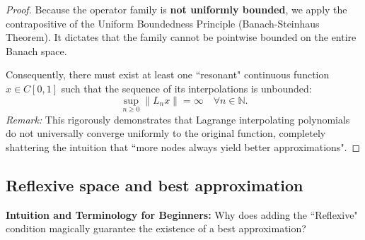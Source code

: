 \documentclass[11pt,a4paper]{article}
\theoremstyle{plain}
\theoremstyle{definition}
\begin{document}
\begin{proof}
    Because the operator family is \textbf{not uniformly bounded}, we apply the contrapositive of the Uniform Boundedness Principle (Banach-Steinhaus Theorem). It dictates that the family cannot be pointwise bounded on the entire Banach space.

    Consequently, there must exist at least one ``resonant" continuous function $x \in C[0,1]$ such that the sequence of its interpolations is unbounded:
    \[
        \sup_{n\ge 0} \|L_n x\| = \infty \quad \forall n\in\mathbb{N}.
    \]
    \textit{Remark:} This rigorously demonstrates that Lagrange interpolating polynomials do not universally converge uniformly to the original function, completely shattering the intuition that ``more nodes always yield better approximations".
\end{proof}

\subsection*{Reflexive space and best approximation}

\textbf{Intuition and Terminology for Beginners:}
Why does adding the ``Reflexive" condition magically guarantee the existence of a best approximation?
\end{document}
